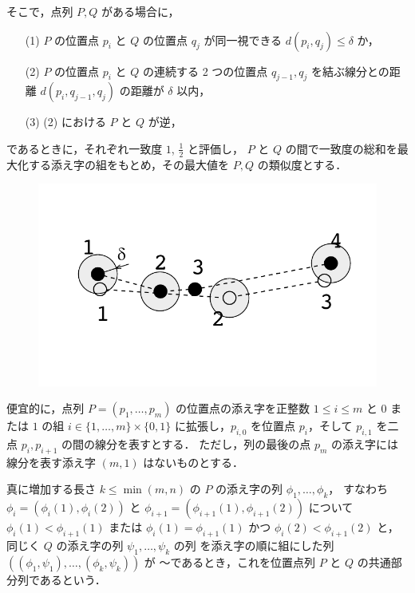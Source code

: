 \documentclass[11pt]{jarticle}
\begin{document}
そこで，点列 $P, Q$ がある場合に，
\begin{itemize}
\item[(1)] $P$ の位置点 $p_i$ と $Q$ の位置点 $q_j$ が同一視できる $d(p_i, q_j) \leq \delta$ か，
\item[(2)] $P$ の位置点 $p_i$ と $Q$ の連続する 2 つの位置点 $q_{j-1}, q_j$ を結ぶ線分との距離 $d(p_i, q_{j-1}, q_j)$ の距離が $\delta$ 以内，
\item[(3)] (2) における $P$ と $Q$ が逆，
\end{itemize}
であるときに，それぞれ一致度 $1$, $\frac{1}{2}$ と評価し，
$P$ と $Q$ の間で一致度の総和を最大化する添え字の組をもとめ，その最大値を $P, Q$ の類似度とする．
\begin{figure}[h]
\centering
\includegraphics[scale=0.5]{matching.pdf}
\end{figure}

便宜的に，点列 $P=(p_1, \ldots, p_m)$ の位置点の添え字を正整数 $1 \leq i \leq m$ と $0$ または $1$ の組
$i \in \{1,\ldots, m\} \times \{0,1\}$ に拡張し，$p_{i,0}$ を位置点 $p_i$，そして $p_{i,1}$ を二点 $p_i, p_{i+1}$ の間の線分を表すとする．
ただし，列の最後の点 $p_m$ の添え字には線分を表す添え字 $(m,1)$ はないものとする．



真に増加する長さ $k \leq \min(m, n)$ の $P$ の添え字の列 $\phi_1, \ldots, \phi_k$，
すなわち $\phi_i = (\phi_i(1), \phi_i(2))$ と $\phi_{i+1} = (\phi_{i+1}(1), \phi_{i+1}(2))$ について $\phi_i(1) < \phi_{i+1}(1)$ または $\phi_i(1) = \phi_{i+1}(1)$ かつ $\phi_i(2) < \phi_{i+1}(2)$ 
 と，同じく $Q$ の添え字の列 $\psi_1, \ldots, \psi_k$ の列
を添え字の順に組にした列 $((\phi_1,\psi_1), \ldots ,(\phi_k,\psi_k))$ 
が
〜であるとき，これを位置点列 $P$ と $Q$ の共通部分列であるという．
\end{document}
